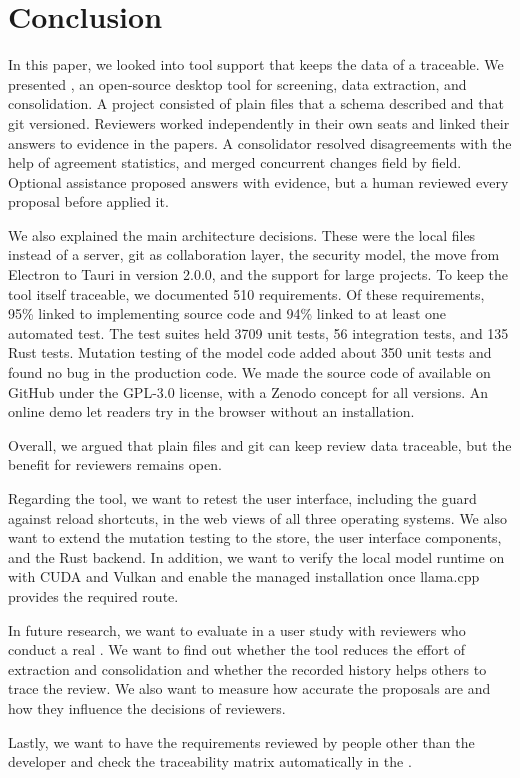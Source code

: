 \section{Conclusion}\label{sec:conclusion}
\acresetall

In this paper, we looked into tool support that keeps the data of a \SLR traceable.
We presented \SaiLoR, an open-source desktop tool for screening, data extraction, and consolidation.
A \SaiLoR project consisted of plain \JSON files that a schema described and that git versioned.
Reviewers worked independently in their own seats and linked their answers to evidence in the papers.
A consolidator resolved disagreements with the help of agreement statistics, and \SaiLoR merged concurrent changes field by field.
Optional \LLM assistance proposed answers with evidence, but a human reviewed every proposal before \SaiLoR applied it.

We also explained the main architecture decisions.
These were the local files instead of a server, git as collaboration layer, the security model, the move from Electron to Tauri in version 2.0.0, and the support for large projects.
To keep the tool itself traceable, we documented 510 requirements.
Of these requirements, 95\% linked to implementing source code and 94\% linked to at least one automated test.
The test suites held 3709 unit tests, 56 integration tests, and 135 Rust tests.
Mutation testing of the model code added about 350 unit tests and found no bug in the production code.
We made the source code of \SaiLoR available on GitHub under the GPL-3.0 license, with a Zenodo concept \DOI for all versions.
An online demo let readers try \SaiLoR in the browser without an installation.

Overall, we argued that plain files and git can keep review data traceable, but the benefit for reviewers remains open.

Regarding the tool, we want to retest the user interface, including the guard against reload shortcuts, in the web views of all three operating systems.
We also want to extend the mutation testing to the store, the user interface components, and the Rust backend.
In addition, we want to verify the local model runtime on \GPUs with CUDA and Vulkan and enable the managed installation once llama.cpp provides the required route.

In future research, we want to evaluate \SaiLoR in a user study with reviewers who conduct a real \SLR.
We want to find out whether the tool reduces the effort of extraction and consolidation and whether the recorded history helps others to trace the review.
We also want to measure how accurate the \LLM proposals are and how they influence the decisions of reviewers.

Lastly, we want to have the requirements reviewed by people other than the developer and check the traceability matrix automatically in the \CI.
